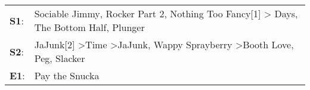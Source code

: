 \begin{supertabular}{p{0.03\textwidth}p{0.92\textwidth}}
 \textbf{S1}:  &                                  Sociable Jimmy\textsuperscript{}, \enspace Rocker Part 2\textsuperscript{}, \enspace Nothing Too Fancy[1]\textsuperscript{} \textgreater {} Days\textsuperscript{}, \enspace The Bottom Half\textsuperscript{}, \enspace Plunger\textsuperscript{}  \enspace  \\
 \textbf{S2}:  &  JaJunk[2]\textsuperscript{} \textgreater \enspace Time\textsuperscript{} \textgreater \enspace JaJunk\textsuperscript{}, \enspace Wappy Sprayberry\textsuperscript{} \textgreater \enspace Booth Love\textsuperscript{}, \enspace Peg\textsuperscript{}, \enspace Slacker\textsuperscript{}  \enspace  \\
 \textbf{E1}:  &                                                                                                                                                                                                                                                             Pay the Snucka\textsuperscript{}  \enspace  \\
\end{supertabular}
